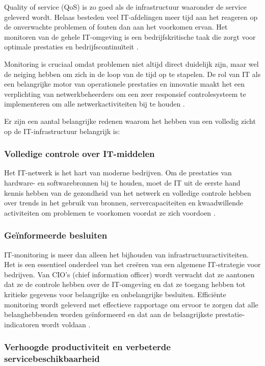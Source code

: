 Quality of service (QoS) is zo goed als de infrastructuur waaronder de service geleverd wordt. Helaas besteden veel IT-afdelingen meer tijd aan het reageren op de onverwachte problemen of fouten dan aan het voorkomen ervan. Het monitoren van de gehele IT-omgeving is een bedrijfskritische taak die zorgt voor optimale prestaties en bedrijfscontinuïteit \autocite{Matrix2016}.

Monitoring is cruciaal omdat problemen niet altijd direct duidelijk zijn, maar wel de neiging hebben om zich in de loop van de tijd op te stapelen. De rol van IT als een belangrijke motor van operationele prestaties en innovatie maakt het een verplichting van netwerkbeheerders om een ​​zeer responsief controlesysteem te implementeren om alle netwerkactiviteiten bij te houden \autocite{Matrix2016}.

Er zijn een aantal belangrijke redenen waarom het hebben van een volledig zicht op de IT-infrastructuur belangrijk is: 

\subsubsection{Volledige controle over IT-middelen}

Het IT-netwerk is het hart van moderne bedrijven. Om de prestaties van hardware- en softwarebronnen bij te houden, moet de IT uit de eerste hand kennis hebben van de gezondheid van het netwerk en volledige controle hebben over trends in het gebruik van bronnen, servercapaciteiten en kwaadwillende activiteiten om problemen te voorkomen voordat ze zich voordoen \autocite{Matrix2016}.

\subsubsection{Geïnformeerde besluiten}

IT-monitoring is meer dan alleen het bijhouden van infrastructuuractiviteiten. Het is een essentieel onderdeel van het creëren van een algemene IT-strategie voor bedrijven. Van CIO's (chief information officer) wordt verwacht dat ze aantonen dat ze de controle hebben over de IT-omgeving en dat ze toegang hebben tot kritieke gegevens voor belangrijke en onbelangrijke besluiten. Efficiënte monitoring wordt geleverd met effectieve rapportage om ervoor te zorgen dat alle belanghebbenden worden geïnformeerd en dat aan de belangrijkste prestatie-indicatoren wordt voldaan \autocite{Matrix2016}.

\subsubsection{Verhoogde productiviteit en verbeterde servicebeschikbaarheid}

